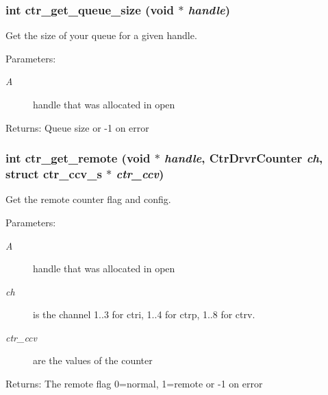 \subsubsection{\setlength{\rightskip}{0pt plus 5cm}int ctr\_\-get\_\-queue\_\-size (void $\ast$ {\em handle})}\label{libctr_8doxygen_cbf9b964cb001ff81deaea39e3431a95}


Get the size of your queue for a given handle. 

\begin{Desc}
\item[Parameters:]
\begin{description}
\item[{\em A}]handle that was allocated in open \end{description}
\end{Desc}
\begin{Desc}
\item[Returns:]Queue size or -1 on error \end{Desc}
\subsubsection{\setlength{\rightskip}{0pt plus 5cm}int ctr\_\-get\_\-remote (void $\ast$ {\em handle}, Ctr\-Drvr\-Counter {\em ch}, struct \bf{ctr\_\-ccv\_\-s} $\ast$ {\em ctr\_\-ccv})}\label{libctr_8doxygen_856a0d3c4d3c4eaf709d9b99c9adda13}


Get the remote counter flag and config. 

\begin{Desc}
\item[Parameters:]
\begin{description}
\item[{\em A}]handle that was allocated in open \item[{\em ch}]is the channel 1..3 for ctri, 1..4 for ctrp, 1..8 for ctrv. \item[{\em ctr\_\-ccv}]are the values of the counter \end{description}
\end{Desc}
\begin{Desc}
\item[Returns:]The remote flag 0=normal, 1=remote or -1 on error \end{Desc}
